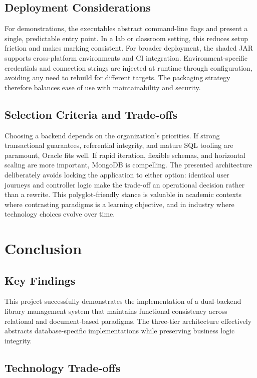 \documentclass[12pt,a4paper]{article}
\begin{document}
\subsection{Deployment Considerations}

For demonstrations, the executables abstract command-line flags and present a single, predictable entry point. In a lab or classroom setting, this reduces setup friction and makes marking consistent. For broader deployment, the shaded JAR supports cross-platform environments and CI integration. Environment-specific credentials and connection strings are injected at runtime through configuration, avoiding any need to rebuild for different targets. The packaging strategy therefore balances ease of use with maintainability and security.

\subsection{Selection Criteria and Trade-offs}

Choosing a backend depends on the organization’s priorities. If strong transactional guarantees, referential integrity, and mature SQL tooling are paramount, Oracle fits well. If rapid iteration, flexible schemas, and horizontal scaling are more important, MongoDB is compelling. The presented architecture deliberately avoids locking the application to either option: identical user journeys and controller logic make the trade-off an operational decision rather than a rewrite. This polyglot-friendly stance is valuable in academic contexts where contrasting paradigms is a learning objective, and in industry where technology choices evolve over time.

\section{Conclusion}

\subsection{Key Findings}

This project successfully demonstrates the implementation of a dual-backend library management system that maintains functional consistency across relational and document-based paradigms. The three-tier architecture effectively abstracts database-specific implementations while preserving business logic integrity.

\subsection{Technology Trade-offs}
\end{document}
